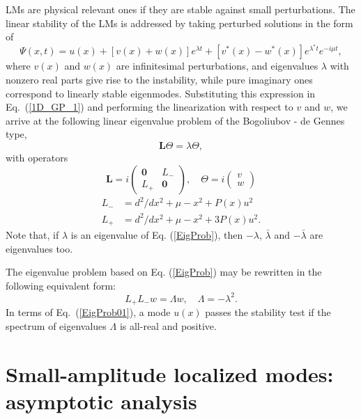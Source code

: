 \documentclass[aps,preprint,showkeys,
]{revtex4}
\begin{document}
LMs are physical relevant ones if they are stable against small
perturbations. The linear stability of the LMs is addressed by taking
perturbed solutions in the form of \cite{JYang}
\begin{equation}
\Psi (x,t)={u(x)+[v(x)+w(x)]e^{\lambda t}+[v^{\ast }(x)-w^{\ast
}(x)]e^{\lambda ^{\ast }t}}e^{-i\mu t},
\end{equation}%
where $v(x)$ and $w(x)$ are infinitesimal perturbations, and eigenvalues $%
\lambda $ with nonzero real parts give rise to the instability, while pure
imaginary ones correspond to linearly stable eigenmodes. Substituting this
expression in Eq.~(\ref{1D_GP_1}) and performing the linearization with
respect to $v$ and $w$, we arrive at the following linear eigenvalue problem
of the Bogoliubov - de Gennes type,
\begin{equation}
\mathbf{L}\Theta =\lambda \Theta ,  \label{EigProb}
\end{equation}%
with operators
\begin{equation}
\mathbf{L}=i\left(
\begin{array}{cc}
\mathbf{0} & L_{-} \\
L_{+} & \mathbf{0}%
\end{array}%
\right) ,\quad \Theta =i\left(
\begin{array}{c}
v \\
w%
\end{array}%
\right)
\end{equation}%
\begin{align}
L_{-}& =d^{2}/dx^{2}+\mu -x^{2}+P(x)u^{2} \\[2mm]
L_{+}& =d^{2}/dx^{2}+\mu -x^{2}+3P(x)u^{2}.
\end{align}%
Note that, if $\lambda $ is an eigenvalue of Eq. (\ref{EigProb}), then $%
-\lambda $, $\bar{\lambda}$ and $-\bar{\lambda}$ are eigenvalues too.

The eigenvalue problem based on Eq. (\ref{EigProb}) may be rewritten in the
following equivalent form:
\begin{equation}
L_{+}L_{-}w=\Lambda w,\quad \Lambda =-\lambda ^{2}.  \label{EigProb01}
\end{equation}%
In terms of Eq.~(\ref{EigProb01}), a mode $u(x)$ passes the stability test
if the spectrum of eigenvalues $\Lambda $ is all-real and positive.

\section{Small-amplitude localized modes: asymptotic analysis}
\end{document}
